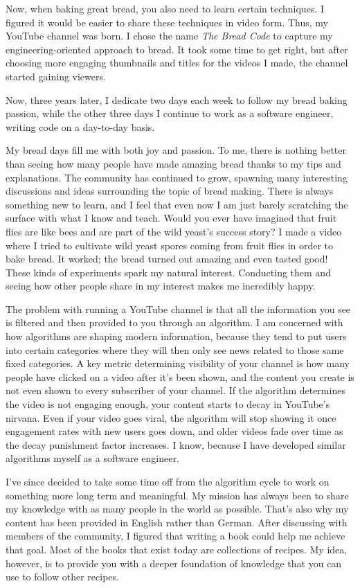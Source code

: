 Now, when baking great bread, you also need to learn certain techniques. I figured it would be
easier to share these techniques in video form. Thus, my YouTube channel was born. I chose
the name {\it The Bread Code} to capture my engineering-oriented approach to bread. It took some
time to get right, but after choosing more engaging thumbnails and titles for
the videos I made, the channel started gaining viewers.

Now, three years later, I dedicate two days each week to follow my bread baking passion, while
the other three days I continue to work as a software engineer, writing code on a day-to-day
basis.

My bread days fill me with both joy and passion. To me, there is nothing better than seeing
how many people have made amazing bread thanks to my tips and explanations. The community has
continued to grow, spawning many interesting discussions and ideas surrounding the topic of
bread making. There is always something new to learn, and I feel that even now I am just barely
scratching the surface with what I know and teach. Would you ever have imagined that fruit
flies are like bees and are part of the wild yeast's success story? I made a video where
I tried to cultivate wild yeast spores coming from fruit flies in order
to bake bread. It worked; the bread turned out amazing and even tasted good! These kinds of
experiments spark my natural interest. Conducting them and seeing how other people share in my
interest makes me incredibly happy.

The problem with running a YouTube channel is that all the information
you see is filtered and then provided to you through an algorithm. I am concerned
with how algorithms are shaping modern information, because they tend to
put users into certain categories where they will then only see news related to
those same fixed categories. A key metric determining visibility of your channel is how many
people have clicked on a video after it's been shown, and the content you create
is not even shown to every subscriber of your channel. If the algorithm determines the video
is not engaging enough, your content starts to decay in YouTube's nirvana. Even if your video
goes viral, the algorithm will stop showing it once engagement rates with new users goes down,
and older videos fade over time as the decay punishment factor increases. I know, because
I have developed similar algorithms myself as a software engineer.

I've since decided to take some time off from the algorithm cycle to work on something more
long term and meaningful. My mission has always been to share my knowledge with as many people
in the world as possible. That's also why my content has been provided in English rather than
German. After discussing with members of the community, I figured that writing a book could
help me achieve that goal. Most of the books that exist today are collections of recipes. My
idea, however, is to provide you with a deeper foundation of knowledge that you can use to
follow other recipes.

